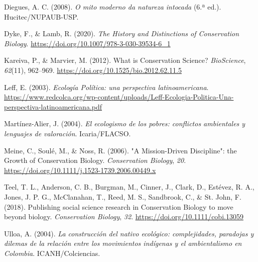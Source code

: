 \documentclass[
  portuguese,
  letterpaper,
  DIV=11,
  numbers=noendperiod]{scrartcl}
\newlength{\cslhangindent}
\newenvironment{CSLReferences}[2] %
 {\begin{list}{}{%
  \setlength{\itemindent}{0pt}
  \setlength{\leftmargin}{0pt}
  \setlength{\parsep}{0pt}
  \ifodd #1
   \setlength{\leftmargin}{\cslhangindent}
   \setlength{\itemindent}{-1\cslhangindent}
  \fi
  \setlength{\itemsep}{#2\baselineskip}}}
 {\end{list}}
\begin{document}
\protect{}\label{refs}
\begin{CSLReferences}{1}{0}
Diegues, A. C. (2008). \emph{O mito moderno da natureza intocada} (6.ª
ed.). Hucitec/NUPAUB-USP.

Dyke, F., \& Lamb, R. (2020). \emph{The History and Distinctions of
Conservation Biology}. \url{https://doi.org/10.1007/978-3-030-39534-6_1}

Kareiva, P., \& Marvier, M. (2012). What is Conservation Science?
\emph{BioScience}, \emph{62}(11), 962--969.
\url{https://doi.org/10.1525/bio.2012.62.11.5}

Leff, E. (2003). \emph{Ecología Política: una perspectiva
latinoamericana}.
\url{https://www.redcolca.org/wp-content/uploads/Leff-Ecologia-Politica-Una-perspectiva-latinoamericana.pdf}

Martínez-Alier, J. (2004). \emph{El ecologismo de los pobres: conflictos
ambientales y lenguajes de valoración}. Icaria/FLACSO.

Meine, C., Soulé, M., \& Noss, R. (2006). "A Mission-Driven Discipline":
the Growth of Conservation Biology. \emph{Conservation Biology},
\emph{20}. \url{https://doi.org/10.1111/j.1523-1739.2006.00449.x}

Teel, T. L., Anderson, C. B., Burgman, M., Cinner, J., Clark, D.,
Estévez, R. A., Jones, J. P. G., McClanahan, T., Reed, M. S., Sandbrook,
C., \& St. John, F. (2018). Publishing social science research in
Conservation Biology to move beyond biology. \emph{Conservation
Biology}, \emph{32}. \url{https://doi.org/10.1111/cobi.13059}

Ulloa, A. (2004). \emph{La construcción del nativo ecológico:
complejidades, paradojas y dilemas de la relación entre los movimientos
indígenas y el ambientalismo en Colombia}. ICANH/Colciencias.

\end{CSLReferences}
\end{document}
